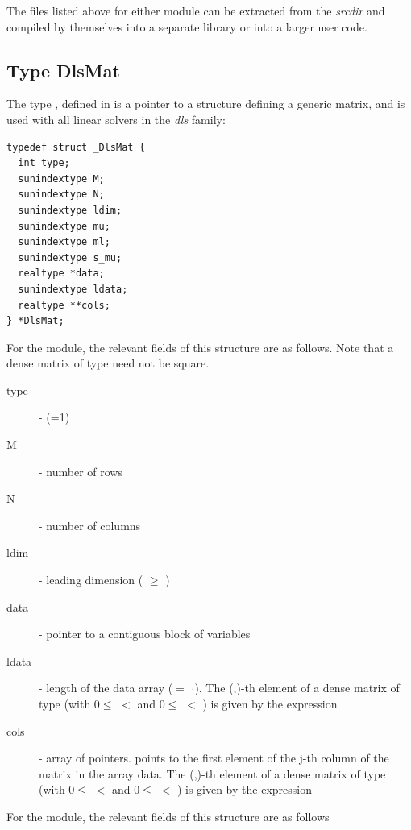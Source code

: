 The files listed above for either module can be extracted  from the {\sundials} 
{\em srcdir} and compiled by themselves into a separate library or into a larger user code.

\subsection{Type DlsMat}
The type , defined in  is a pointer to a 
structure defining a generic matrix, and is used with all linear solvers in 
the {\em dls} family:
\begin{verbatim}
typedef struct _DlsMat {
  int type;
  sunindextype M;
  sunindextype N;
  sunindextype ldim;
  sunindextype mu;
  sunindextype ml;
  sunindextype s_mu;
  realtype *data;
  sunindextype ldata;
  realtype **cols;
} *DlsMat;
\end{verbatim}
For the {\dense} module, the relevant fields of this structure are as follows.
Note that a dense matrix of type  need not be square.
\begin{description}
  \item[type]  -  (=1)
  \item[M]  - number of rows
  \item[N]  - number of columns
  \item[ldim]  - leading dimension ( $\ge$ )
  \item[data]  - pointer to a contiguous block of  variables
  \item[ldata] - length of the data array ($=$ $\cdot$).
    The (,)-th element of a dense matrix  of type 
    (with $0 \le$  $<$  and $ 0 \le$  $<$ ) 
    is given by the expression 
  \item[cols]  - array of pointers.  points to the first element 
    of the j-th column of the matrix in the array data.
    The (,)-th element of a dense matrix  of type 
    (with $0 \le$  $<$  and $ 0 \le$  $<$ ) 
    is given by the expression  
\end{description}
For the {\band} module, the relevant fields of this structure are as follows
